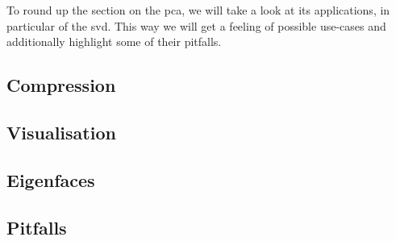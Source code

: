 To round up the section on the \acrlong{pca}, we will take a look at its applications, in particular of the \acrlong{svd}.
This way we will get a feeling of possible use-cases and additionally highlight some of their pitfalls.


\subsection{Compression}

\clearpage



\subsection{Visualisation}

\clearpage


\subsection{Eigenfaces}

\clearpage

\subsection{Pitfalls}

\clearpage
